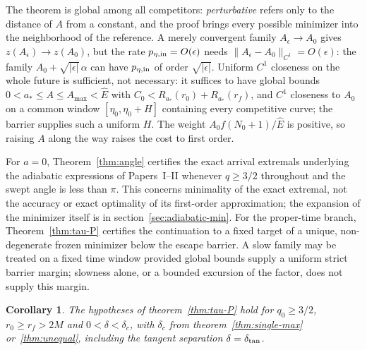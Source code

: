 \documentclass[aip,jmp,amsmath,amssymb,reprint]{revtex4-2}
\newcommand{\Ehat}{\hat E}
\theoremstyle{plain}
\newtheorem{corollary}[proposition]{Corollary}
\theoremstyle{definition}
\begin{document}
The theorem is global among all competitors: \emph{perturbative} refers only to the
distance of $A$ from a constant, and the proof brings every possible minimizer into the
neighborhood of the reference. A merely convergent family $A_\epsilon\to A_0$ gives
$z(A_\epsilon)\to z(A_0)$, but the rate $p_{\eta,{\rm in}}=O(\epsilon)$ needs
$\|A_\epsilon-A_0\|_{C^1}=O(\epsilon)$: the family $A_0+\sqrt{|\epsilon|}\,\alpha$ can have $p_{\eta,{\rm in}}$ of
order $\sqrt{|\epsilon|}$. Uniform $C^1$ closeness on the whole future is sufficient, not
necessary: it suffices to have global bounds $0<a_*\le A\le A_{\max}<\Ehat$ with
$C_0<R_{a_*}(r_0)+R_{a_*}(r_f)$, and $C^1$ closeness to $A_0$ on a common window
$[\eta_0,\eta_0+H]$ containing every competitive curve; the barrier supplies such a uniform
$H$. The weight
$A_0f(N_0+1)/\Ehat$ is positive, so raising $A$ along the way raises the cost to first order.

For $a=0$, Theorem~\ref{thm:angle} certifies the exact arrival extremals underlying the
adiabatic expressions of Papers~I--II whenever $q\ge3/2$ throughout and the swept angle is
less than $\pi$. This concerns minimality of the exact
extremal, not the accuracy or exact optimality of its first-order approximation; the expansion of
the minimizer itself is in section~\ref{sec:adiabatic-min}. For the
proper-time branch, Theorem~\ref{thm:tau-P} certifies the continuation to a fixed target of a
unique, non-degenerate frozen minimizer below the escape barrier. A slow family may be
treated on a fixed time window provided global bounds supply a uniform strict barrier
margin; slowness alone, or a bounded excursion of the factor, does not supply this margin.

\begin{corollary}\label{cor:tau-P}
The hypotheses of theorem~\ref{thm:tau-P} hold for $q_0\ge3/2$, $r_0\ge r_f>2M$ and
$0<\delta<\delta_c$, with $\delta_c$ from theorem~\ref{thm:single-max} or~\ref{thm:unequal},
including the tangent separation $\delta=\delta_{\rm tan}$.
\end{corollary}
\end{document}
